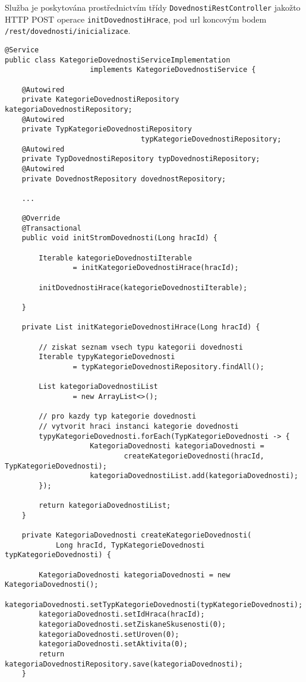 \documentclass[12pt]{article}
\begin{document}
{Služba je poskytována prostřednictvím třídy \texttt{DovednostiRestController} jakožto HTTP POST operace \texttt{initDovednostiHrace},
pod url koncovým bodem \texttt{/rest/dovednosti/inicializace}.

\begin{lstlisting}
@Service
public class KategorieDovednostiServiceImplementation 
                    implements KategorieDovednostiService {
        
    @Autowired
    private KategorieDovednostiRepository kategoriaDovednostiRepository;
    @Autowired
    private TypKategorieDovednostiRepository 
                                typKategorieDovednostiRepository;
    @Autowired
    private TypDovednostiRepository typDovednostiRepository;
    @Autowired
    private DovednostRepository dovednostRepository;
    
    ...
    
    @Override
    @Transactional
    public void initStromDovednosti(Long hracId) {
        
        Iterable kategorieDovednostiIterable
                = initKategorieDovednostiHrace(hracId);

        initDovednostiHrace(kategorieDovednostiIterable);

    }
    
    private List initKategorieDovednostiHrace(Long hracId) {

        // ziskat seznam vsech typu kategorii dovednosti
        Iterable typyKategorieDovednosti
                = typKategorieDovednostiRepository.findAll();
    
        List kategoriaDovednostiList
                = new ArrayList<>();
    
        // pro kazdy typ kategorie dovednosti
        // vytvorit hraci instanci kategorie dovednosti
        typyKategorieDovednosti.forEach(TypKategorieDovednosti -> {
                    KategoriaDovednosti kategoriaDovednosti =
                            createKategorieDovednosti(hracId, TypKategorieDovednosti);
                    kategoriaDovednostiList.add(kategoriaDovednosti);
        });

        return kategoriaDovednostiList;
    }
    
    private KategoriaDovednosti createKategorieDovednosti(
            Long hracId, TypKategorieDovednosti typKategorieDovednosti) {

        KategoriaDovednosti kategoriaDovednosti = new KategoriaDovednosti();
        kategoriaDovednosti.setTypKategorieDovednosti(typKategorieDovednosti);
        kategoriaDovednosti.setIdHraca(hracId);
        kategoriaDovednosti.setZiskaneSkusenosti(0);
        kategoriaDovednosti.setUroven(0);
        kategoriaDovednosti.setAktivita(0);
        return kategoriaDovednostiRepository.save(kategoriaDovednosti);
    }
    

\end{lstlisting}}
\end{document}
